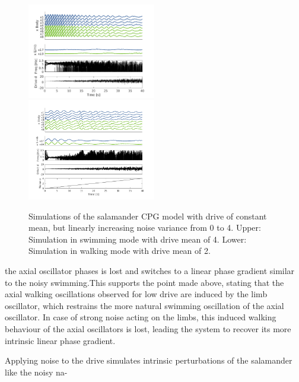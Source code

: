 \documentclass[a4paper]{scrartcl}
\begin{document}
\begin{figure}[!h]
    	\includegraphics[width=0.5\textwidth]{fig/figure7b_drive-increasing-gaussian-swim.png}
	\includegraphics[width=0.5\textwidth]{fig/figure7b_drive-increasing-gaussian-walk.png}
	\caption{Simulations of the salamander CPG model with drive of constant mean, but linearly increasing noise variance from 0 to 4. Upper: Simulation in swimming mode with drive mean of 4. Lower: Simulation in walking mode with drive mean of 2.}
	\label{fig:7b-drive}
\end{figure}

{\setlength{\parindent}{0 cm}
the axial oscillator phases is lost and switches to a linear phase gradient similar to the noisy swimming.This supports the point made above, stating that the axial walking oscillations observed for low drive are induced by the limb oscillator, which restrains the more natural swimming oscillation of the axial oscillator. In case of strong noise acting on the limbs, this induced walking behaviour of the axial oscillators is lost, leading the system to recover its more intrinsic linear phase gradient.
}

Applying noise to the drive simulates intrinsic perturbations of the salamander like the noisy na-
\end{document}
